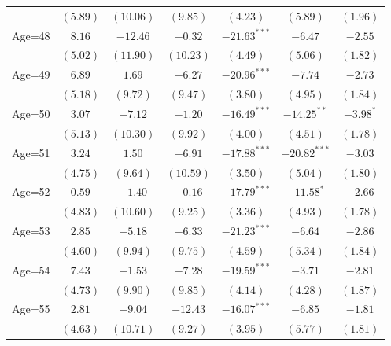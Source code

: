 \documentclass[fullpage]{paper}
\begin{document}
\begin{center}
\begin{longtable}{l c c c c c c }
            & $(5.89)$      & $(10.06)$     & $(9.85)$      & $(4.23)$       & $(5.89)$       & $(1.96)$      \\
Age=48      & $8.16$        & $-12.46$      & $-0.32$       & $-21.63^{***}$ & $-6.47$        & $-2.55$       \\
            & $(5.02)$      & $(11.90)$     & $(10.23)$     & $(4.49)$       & $(5.06)$       & $(1.82)$      \\
Age=49      & $6.89$        & $1.69$        & $-6.27$       & $-20.96^{***}$ & $-7.74$        & $-2.73$       \\
            & $(5.18)$      & $(9.72)$      & $(9.47)$      & $(3.80)$       & $(4.95)$       & $(1.84)$      \\
Age=50      & $3.07$        & $-7.12$       & $-1.20$       & $-16.49^{***}$ & $-14.25^{**}$  & $-3.98^{*}$   \\
            & $(5.13)$      & $(10.30)$     & $(9.92)$      & $(4.00)$       & $(4.51)$       & $(1.78)$      \\
Age=51      & $3.24$        & $1.50$        & $-6.91$       & $-17.88^{***}$ & $-20.82^{***}$ & $-3.03$       \\
            & $(4.75)$      & $(9.64)$      & $(10.59)$     & $(3.50)$       & $(5.04)$       & $(1.80)$      \\
Age=52      & $0.59$        & $-1.40$       & $-0.16$       & $-17.79^{***}$ & $-11.58^{*}$   & $-2.66$       \\
            & $(4.83)$      & $(10.60)$     & $(9.25)$      & $(3.36)$       & $(4.93)$       & $(1.78)$      \\
Age=53      & $2.85$        & $-5.18$       & $-6.33$       & $-21.23^{***}$ & $-6.64$        & $-2.86$       \\
            & $(4.60)$      & $(9.94)$      & $(9.75)$      & $(4.59)$       & $(5.34)$       & $(1.84)$      \\
Age=54      & $7.43$        & $-1.53$       & $-7.28$       & $-19.59^{***}$ & $-3.71$        & $-2.81$       \\
            & $(4.73)$      & $(9.90)$      & $(9.85)$      & $(4.14)$       & $(4.28)$       & $(1.87)$      \\
Age=55      & $2.81$        & $-9.04$       & $-12.43$      & $-16.07^{***}$ & $-6.85$        & $-1.81$       \\
            & $(4.63)$      & $(10.71)$     & $(9.27)$      & $(3.95)$       & $(5.77)$       & $(1.81)$      \\

\end{longtable}
\end{center}
\end{document}
